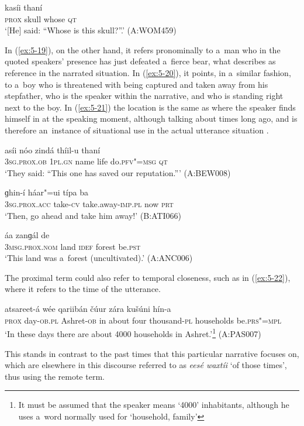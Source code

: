 \begin{exe}
\ex
\label{ex:5-18}
 kasíi thaní \\
\textsc{prox} skull whose \textsc{qt} \\
\glt `[He] said: ``Whose is this skull?''.' (A:WOM459)
\end{exe}
In (\ref{ex:5-19}), on the other hand, it refers pronominally to a~man who in the quoted speakers' presence has just defeated a~fierce bear, what \citet[222]{himmelmann1996} describes as reference in the narrated situation. In (\ref{ex:5-20}), it points, in a~similar fashion, to a~boy who is threatened with being captured and taken away from his stepfather, who is the speaker within the narrative, and who is standing right next to the boy. In (\ref{ex:5-21}) the location is the same as where the speaker finds himself in at the speaking moment, although talking about times long ago, and is therefore an~instance of situational use in the actual utterance situation \citep[222]{himmelmann1996}.

\begin{exe}
\ex
\label{ex:5-19}
\gll [aníi] asíi nóo zindá thíil-u thaní \\
\textsc{3sg.prox.ob} \textsc{1pl.gn} name life do.\textsc{pfv"=msg} \textsc{qt} \\
\glt `They said: ``This one has saved our reputation.''' (A:BEW008)

\ex
\label{ex:5-20}
\gll [hanís] ɡhin-í háar"=ui típa ba \\
\textsc{3sg.prox.acc} take-\textsc{cv} take.away-\textsc{imp.pl} now \textsc{prt} \\
\glt `Then, go ahead and take him away!' (B:ATI066)

\ex
\label{ex:5-21}
 áa zanɡál de \\
\textsc{3msg.prox.nom} land \textsc{idef} forest be.\textsc{pst} \\
\glt `This land was a~forest (uncultivated).' (A:ANC006)
\end{exe}
The proximal term could also refer to temporal closeness, such as in (\ref{ex:5-22}), where it refers to the time of the utterance.

\begin{exe}
\ex
\label{ex:5-22}
 atsareet-á wée qariibán čúur zára kušúni
hín-a \\
\textsc{prox} day-\textsc{ob.pl} Ashret-\textsc{ob} in about four thousand-\textsc{pl} households
be.\textsc{prs"=mpl} \\
\glt `In these days there are about 4000 households in Ashret.'\footnote{It must be assumed that the speaker means `4000' inhabitants, although he uses a~word normally used for `household, family'} (A:PAS007)
\end{exe}
This stands in contrast to the past times that this particular narrative focuses on, which are elsewhere in this discourse referred to as \textit{eesé waxtíi} `of those times', thus using the remote term.

